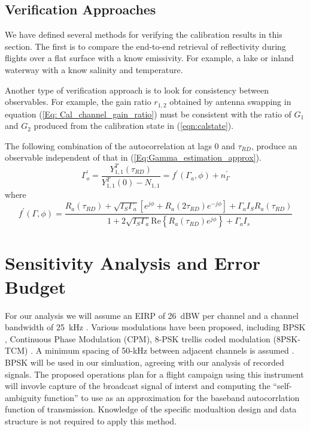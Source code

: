 \documentclass[draftcls,onecolumn]{IEEEtran}  %
\begin{document}
\subsection{Verification Approaches}
We have defined several methods for verifying the calibration results in this section.
The first is to compare the end-to-end retrieval of reflectivity during flights over a flat surface with a know emissivity. 
For example, a lake or inland waterway with a know salinity and temperature. 

Another type of verification approach is to look for consistency between observables. 
For example, the gain ratio $r_{1,2}$ obtained by antenna swapping in equation (\ref{Eq: Cal_channel_gain_ratio}) must be consistent with the ratio of $G_1$ and $G_2$ produced from the   calibration state in (\ref{eqn:calstate}). 

The following combination of the autocorrelation at lags $0$ and $\tau_{RD}$, produce an  observable independent of that in  
(\ref{Eq:Gamma_estimation_approx}).  
\begin{equation}
\Gamma_o^{'} = \frac{Y_{1,1}^T(\tau_{RD})}{Y_{1,1}^T(0) - N_{1,1}} = f^{'}(\Gamma_a, \phi) + n_{\Gamma}^{'}
\label{eqn:obsverify}
\end{equation}
where 
\begin{equation}
f^{'}(\Gamma, \phi) = \frac{R_a(\tau_{RD}) + \sqrt{I_S \Gamma_a} \left[ e^{j\phi} + R_a(2\tau_{RD}) e^{-j \phi} \right] + \Gamma_a I_S R_a(\tau_{RD}) }
   {1 + 2 \sqrt{I_S \Gamma_a} \mathrm{Re}\left\{ R_a (\tau_{RD}) e^{j \phi}\right\} + \Gamma_a I_s}
\label{eqn:fprime}
\end{equation}



   
\section{Sensitivity Analysis and Error Budget}

For our analysis we will assume an EIRP of 26~dBW per channel and a channel bandwidth of 25~kHz \cite{Franke1997}.
Various modulations have been proposed, including BPSK \cite{Wadsworth}, Continuous Phase Modulation (CPM), 8-PSK trellis coded modulation (8PSK-TCM) \cite{Battista1998}. 
A minimum spacing of 50-kHz between adjacent channels is assumed \cite{Wadsworth}.
BPSK will be used in our simluation, agreeing with our analysis of recorded signals.  
The proposed operations plan for a flight campaign using this instrument will invovle  capture of the broadcast signal of interst and computing the ``self-ambiguity function'' \cite{Pettersson2000c} to use as an approximation for the baseband autocorrlation function of transmission.
Knowledge of the specific modualtion design and data structure is not required to apply this method. 
\end{document}
